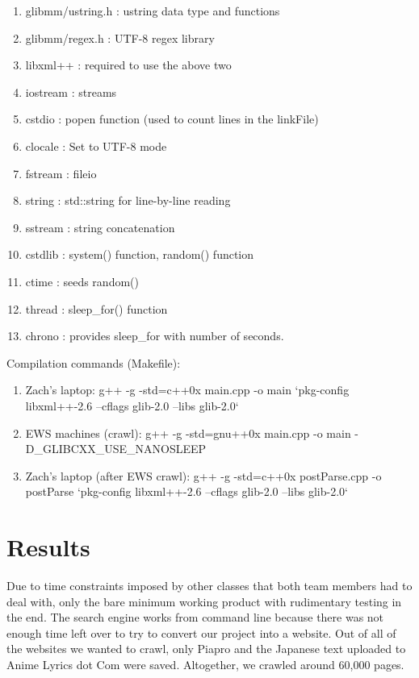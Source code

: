 \documentclass{acm} %
\begin{document}
\begin{CJK}{UTF8}{zhsong}
\begin{enumerate}
 \item glibmm/ustring.h : ustring data type and functions
 \item glibmm/regex.h : UTF-8 regex library
 \item libxml++ : required to use the above two
 \item iostream : streams
 \item cstdio : popen function (used to count lines in the linkFile)
 \item clocale : Set to UTF-8 mode
 \item fstream : fileio
 \item string : std::string for line-by-line reading
 \item sstream : string concatenation
 \item cstdlib : system() function, random() function
 \item ctime : seeds random()
 \item thread : sleep\_for() function
 \item chrono : provides sleep\_for with number of seconds.
\end{enumerate}

Compilation commands (Makefile):

\begin{enumerate}
 \item Zach's laptop: g++ -g -std=c++0x main.cpp -o main `pkg-config libxml++-2.6 --cflags glib-2.0 --libs glib-2.0`
 \item EWS machines (crawl): g++ -g -std=gnu++0x main.cpp -o main -D\_GLIBCXX\_USE\_NANOSLEEP
 \item Zach's laptop (after EWS crawl): g++ -g -std=c++0x postParse.cpp -o postParse `pkg-config libxml++-2.6 --cflags glib-2.0 --libs glib-2.0`
\end{enumerate}

\section{Results}

Due to time constraints imposed by other classes that both team members had to deal with, only the bare minimum working product with rudimentary testing in the end. The search engine works from command line because there was not enough time left over to try to convert our project into a website. Out of all of the websites we wanted to crawl, only Piapro and the Japanese text uploaded to Anime Lyrics dot Com were saved. Altogether, we crawled around 60,000 pages.


\end{CJK}
\end{document}
